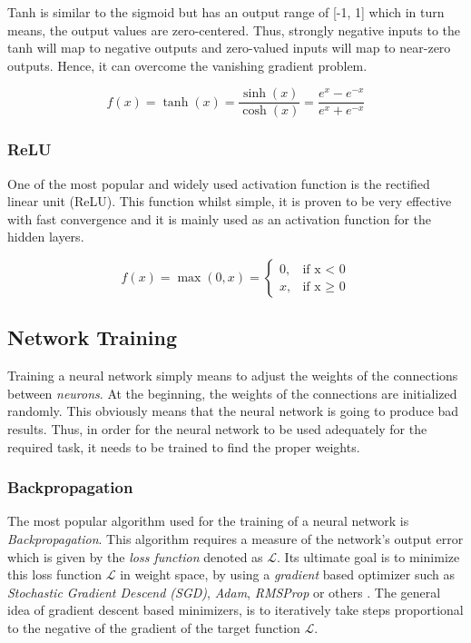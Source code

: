 \documentclass[a4paper, 12pt]{article}
\numberwithin{equation}{section}
\numberwithin{figure}{section}
\numberwithin{table}{section}
\begin{document}
	Tanh is similar to the sigmoid but has an output range of [-1, 1] which in turn means, the output values are zero-centered. Thus, strongly negative inputs to the tanh will map to negative outputs and zero-valued inputs will map to near-zero outputs. Hence, it can overcome the vanishing gradient problem.
	
	\begin{equation}
		f(x) = \tanh(x) = \frac{\sinh(x)}{\cosh(x)} = \frac{e^{x} - e^{-x}}{e^{x} + e^{-x}}
	\end{equation}

	
	
	\subsubsection{ReLU}
	
	One of the most popular and widely used activation function is the rectified linear unit (ReLU). This function whilst simple, it is proven to be very effective with fast convergence and it is mainly used as an activation function for the hidden layers.
	
	\begin{equation}
		f(x) = \max(0, x) =
		\begin{cases}
			0, & \text{if x $<$ 0} \\
			x, & \text{if x $\geq$ 0}
		\end{cases}
	\end{equation}
	
	
	
	\subsection{Network Training}
	
	Training a neural network simply means to adjust the weights of the connections between \textit{neurons}. At the beginning, the weights of the connections are initialized randomly. This obviously means that the neural network is going to produce bad results. Thus, in order for the neural network to be used adequately for the required task, it needs to be trained to find the proper weights.\par
	
	\subsubsection{Backpropagation}
	
	The most popular algorithm used for the training of a neural network is \textit{Backpropagation}. This algorithm requires a measure of the network's output error which is given by the \textit{loss function} denoted as $\mathcal{L}$. Its ultimate goal is to minimize this loss function $\mathcal{L}$ in weight space, by using a \textit{gradient} based optimizer such as \textit{Stochastic Gradient Descend (SGD)}, \textit{Adam}, \textit{RMSProp} or others \cite{gradient_descent}.
	The general idea of gradient descent based minimizers, is to iteratively take steps proportional to the negative of the gradient of the target function $\mathcal{L}$.
	
\end{document}

